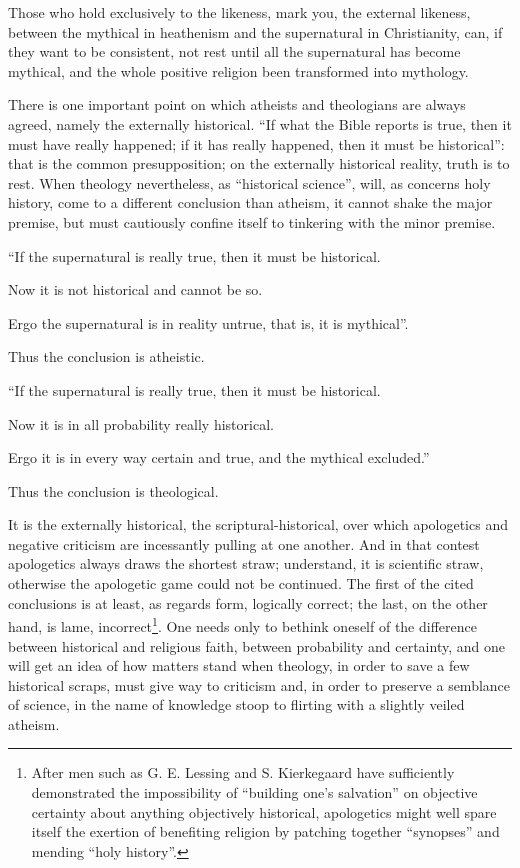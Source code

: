\documentclass[12pt,a4paper,openany]{book}
\newcommand{\opage}[1]{\marginnote{\footnotesize\textit{[#1]}}}
\begin{document}
Those who hold exclusively to the likeness, mark you,
the external likeness, between the mythical in heathenism
and the supernatural in Christianity, can,
if they want to be consistent, not rest until
all the supernatural has become mythical, and the whole
positive religion been transformed into mythology.

There is one important point on which atheists and theologians
are always agreed, namely the externally historical.
``If what the Bible reports is true, then it must have really
happened; if it has really happened, then it must be
historical'': that is the common presupposition; on
the externally historical reality, truth is to rest.
When theology nevertheless, as ``historical science'',
\setcounter{footnote}{0}%
\opage{430}will, as concerns holy history, come to a
different conclusion than atheism, it cannot shake
the major premise, but must cautiously confine itself to
tinkering with the minor premise.

``If the supernatural is really true, then it must
be historical.

Now it is not historical and cannot be so.

Ergo the supernatural is in reality untrue,
that is, it is mythical''.

Thus the conclusion is atheistic.

``If the supernatural is really true, then
it must be historical.

Now it is in all probability really historical.

Ergo it is in every way certain and true, and the
mythical excluded.''

Thus the conclusion is theological.

It is the externally historical, the scriptural-historical,
over which apologetics and negative criticism are incessantly
pulling at one another. And in that contest apologetics always draws
the shortest straw; understand, it is scientific
straw, otherwise the apologetic game could not be continued.
The first of the cited conclusions is at least,
as regards form, logically correct; the
last, on the other hand, is lame, incorrect\footnote[1]{After men such as G. E. Lessing and S. Kierkegaard have sufficiently demonstrated the impossibility of ``building one's salvation'' on objective certainty about anything objectively historical, apologetics might well spare itself the exertion of benefiting religion by patching together ``synopses'' and mending ``holy history''.}. One needs
only to bethink oneself of the difference between historical and
\setcounter{footnote}{0}%
\opage{431}religious faith, between probability and certainty, and one
will get an idea of how matters stand
when theology, in order to save a few historical scraps,
must give way to criticism and, in order to preserve a semblance of science,
in the name of knowledge stoop to flirting
with a slightly veiled atheism.
\end{document}
